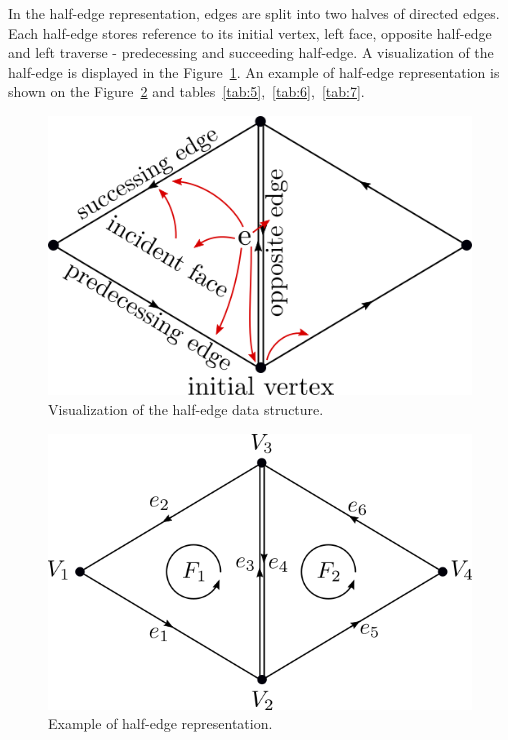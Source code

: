In the half-edge representation, edges are split into two halves of directed edges.
Each half-edge
stores reference to its initial vertex, left face, opposite half-edge and left
traverse - predecessing and succeeding half-edge. A visualization of the
half-edge is displayed in the Figure~\ref{img:32}. An example of half-edge
representation is shown on the Figure~\ref{img:31} and 
tables~\ref{tab:5},~\ref{tab:6},~\ref{tab:7}.

\begin{figure}
    \centerline{\includegraphics[scale=0.5]{images/img32}}
    \caption[Visualisation of the half-edge data structure]
    {Visualization of the half-edge data structure.}
    \label{img:32}
\end{figure}

\begin{figure}
    \centerline{\includegraphics[scale=0.5]{images/img31}}
    \caption[Example of half-edge representation]
    {Example of half-edge representation.}
    \label{img:31}
\end{figure}

